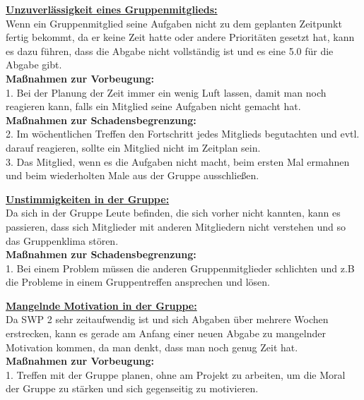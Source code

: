 \documentclass[fontsize=12pt,paper=a4,twoside]{scrartcl}
\begin{document}
\bigskip

\textbf{\underline{Unzuverlässigkeit eines Gruppenmitglieds:}}\\
Wenn ein Gruppenmitglied seine Aufgaben nicht zu dem geplanten Zeitpunkt fertig bekommt, da er keine Zeit hatte oder andere Prioritäten gesetzt hat, kann es dazu führen, dass die Abgabe nicht vollständig ist und es eine 5.0 für die Abgabe gibt.\\
\textbf{Maßnahmen zur Vorbeugung:}\\
1. Bei der Planung der Zeit immer ein wenig Luft lassen, damit man noch reagieren kann, falls ein Mitglied seine Aufgaben nicht gemacht hat.\\
\textbf{Maßnahmen zur Schadensbegrenzung:}\\
2. Im wöchentlichen Treffen den Fortschritt jedes Mitglieds begutachten und evtl. darauf reagieren, sollte ein Mitglied nicht im Zeitplan sein.\\
3. Das Mitglied, wenn es die Aufgaben nicht macht, beim ersten Mal ermahnen und beim wiederholten Male aus der Gruppe ausschließen.\\

\bigskip

\textbf{\underline{Unstimmigkeiten in der Gruppe:}}\\
Da sich in der Gruppe Leute befinden, die sich vorher nicht kannten, kann es passieren, dass sich Mitglieder mit anderen Mitgliedern nicht verstehen und so das Gruppenklima stören.\\
\textbf{Maßnahmen zur Schadensbegrenzung:}\\
1. Bei einem Problem müssen die anderen Gruppenmitglieder schlichten und z.B die Probleme in einem Gruppentreffen ansprechen und lösen.\\

\bigskip 

\textbf{\underline{Mangelnde Motivation in der Gruppe:}}\\
Da SWP 2 sehr zeitaufwendig ist und sich Abgaben über mehrere Wochen erstrecken, kann es gerade am Anfang einer neuen Abgabe zu mangelnder Motivation kommen, da man denkt, dass man noch genug Zeit hat.\\
\textbf{Maßnahmen zur Vorbeugung:}\\
1. Treffen mit der Gruppe planen, ohne am Projekt zu arbeiten, um die Moral der Gruppe zu stärken und sich gegenseitig zu motivieren.\\

\bigskip
\end{document}

